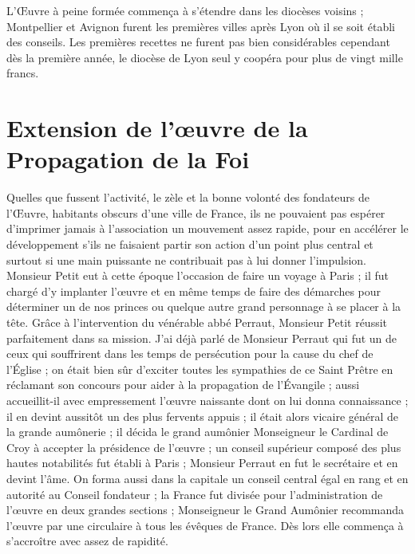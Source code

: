\documentclass[11pt,a4paper]{report}
\begin{document}
L'Œuvre à peine formée commença à s'étendre dans les diocèses voisins ; Montpellier et Avignon furent les premières villes après Lyon où il se soit établi des conseils. Les premières recettes ne furent pas bien considérables cependant dès la première année, le diocèse de Lyon seul y coopéra pour plus de vingt mille francs.

\section*{Extension de l'œuvre de la Propagation de la Foi}

Quelles que fussent l'activité, le zèle et la bonne volonté des fondateurs de l'Œuvre, habitants obscurs d'une ville de France, ils ne pouvaient pas espérer d'imprimer jamais à l'association un mouvement assez rapide, pour en accélérer le développement s'ils ne faisaient partir son action d'un point plus central et surtout si une main puissante ne contribuait pas à lui donner l'impulsion. Monsieur Petit eut à cette époque l'occasion de faire un voyage à Paris ; il fut chargé d'y implanter l'œuvre et en même temps de faire des démarches pour déterminer un de nos princes ou quelque autre grand personnage à se placer à la tête. Grâce à l'intervention du vénérable abbé Perraut, Monsieur Petit réussit parfaitement dans sa mission. J'ai déjà parlé de Monsieur Perraut qui fut un de ceux qui souffrirent dans les temps de persécution pour la cause du chef de l'Église ; on était bien sûr d'exciter toutes les sympathies de ce Saint Prêtre en réclamant son concours pour aider à la propagation de l'Évangile ; aussi accueillit-il avec empressement l'œuvre naissante dont on lui donna connaissance ; il en devint aussitôt un des plus fervents appuis ; il était alors vicaire général de la grande aumônerie ; il décida le grand aumônier Monseigneur le Cardinal de Croy à accepter la présidence de l'œuvre ; un conseil supérieur composé des plus hautes notabilités fut établi à Paris ; Monsieur Perraut en fut le secrétaire et en devint l'âme. On forma aussi dans la capitale un conseil central égal en rang et en autorité au Conseil fondateur ; la France fut divisée pour l'administration de l'œuvre en deux grandes sections ; Monseigneur le Grand Aumônier recommanda l'œuvre par une circulaire à tous les évêques de France. Dès lors elle commença à s'accroître avec assez de rapidité.
\end{document}
